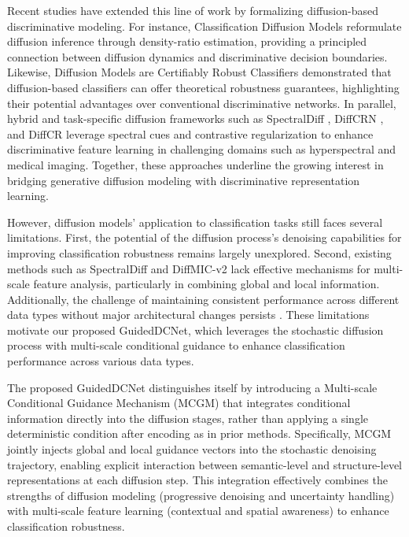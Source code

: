 \documentclass[a4paper,fleqn]{cas-sc}
\begin{document}
Recent studies have extended this line of work by formalizing diffusion-based discriminative modeling. For instance, Classification Diffusion Models \cite{yadin2024classification} reformulate diffusion inference through density-ratio estimation, providing a principled connection between diffusion dynamics and discriminative decision boundaries. Likewise, Diffusion Models are Certifiably Robust Classifiers \cite{chen2024diffusion} demonstrated that diffusion-based classifiers can offer theoretical robustness guarantees, highlighting their potential advantages over conventional discriminative networks. In parallel, hybrid and task-specific diffusion frameworks such as SpectralDiff \cite{chen2023spectraldiff}, DiffCRN \cite{zhu2025spatial}, and DiffCR \cite{zou2024diffcr} leverage spectral cues and contrastive regularization to enhance discriminative feature learning in challenging domains such as hyperspectral and medical imaging. Together, these approaches underline the growing interest in bridging generative diffusion modeling with discriminative representation learning.

However, diffusion models' application to classification tasks still faces several limitations. First, the potential of the diffusion process’s denoising capabilities for improving classification robustness remains largely unexplored. Second, existing methods such as SpectralDiff and DiffMIC-v2 \cite{chen2023spectraldiff,yang2025diffmic} lack effective mechanisms for multi-scale feature analysis, particularly in combining global and local information. Additionally, the challenge of maintaining consistent performance across different data types without major architectural changes persists \cite{ho2020denoising}. These limitations motivate our proposed GuidedDCNet, which leverages the stochastic diffusion process with multi-scale conditional guidance to enhance classification performance across various data types.

The proposed GuidedDCNet distinguishes itself by introducing a Multi-scale Conditional Guidance Mechanism (MCGM) that integrates conditional information directly into the diffusion stages, rather than applying a single deterministic condition after encoding as in prior methods. Specifically, MCGM jointly injects global and local guidance vectors into the stochastic denoising trajectory, enabling explicit interaction between semantic-level and structure-level representations at each diffusion step. This integration effectively combines the strengths of diffusion modeling (progressive denoising and uncertainty handling) with multi-scale feature learning (contextual and spatial awareness) to enhance classification robustness.
\end{document}
